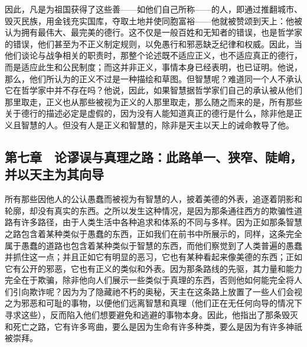 因此，凡是为祖国获得了这些善——如他们自己所称——的人，即通过推翻城市、毁灭民族，用金钱充实国库，夺取土地并使同胞富裕——他就被赞颂到天上：他被认为拥有最伟大、最完美的德行。这不仅是一般百姓和无知者的错误，也是哲学家的错误，他们甚至为不正义制定规则，以免愚行和邪恶缺乏纪律和权威。因此，当他们谈论与战争相关的职责时，那整个论述既不适应正义，也不适应真正的德行，而是适应此生和公民制度；而这并非正义，事情本身已经表明，也已证明。他说，那么，他们所认为的正义不过是一种描绘和草图。但智慧呢？难道同一个人不承认它在哲学家中并不存在吗？他说，因此，如果智慧据哲学家们自己的承认被从他们那里取走，正义也从那些被视为正义的人那里取走，那么随之而来的是，所有那些关于德行的描述必定是虚假的，因为没有人能知道真正的德行是什么，除非他是正义且智慧的人。但没有人是正义和智慧的，除非是天主以天上的诫命教导了他。\par


\subsection{第七章　论谬误与真理之路：此路单一、狭窄、陡峭，并以天主为其向导}

所有那些因他人的公认愚蠢而被视为有智慧的人，披着美德的外表，追逐着阴影和轮廓，却没有真实的东西。之所以发生这种情况，是因为那条通往西方的欺骗性道路有许多路径，由于人类生活中各种追求和体系的不同与多样。因为正如那条智慧之路包含着某种类似于愚蠢的东西，正如我们在前书中所展示的，同样，这条完全属于愚蠢的道路也包含着某种类似于智慧的东西，而他们察觉到了人类普遍的愚蠢并抓住这一点；并且正如它有明显的恶习，它也有某种看起来像美德的东西；正如它有公开的邪恶，它也有正义的类似和外表。因为那条路线的先驱，其力量和能力完全在于欺骗，除非他向人们展示一些类似于真理的东西，否则他如何能完全将人们引向欺诈呢？因为为了隐藏祂不朽的奥秘，天主在这条路上放置了一些人们会视之为邪恶和可耻的事物，以便他们远离智慧和真理（他们正在无任何向导的情况下寻求这些），反而陷入他们想要避免和逃避的事物本身。因此，他指出了那条毁灭和死亡之路，它有许多弯曲，要么是因为生命有许多种类，要么是因为有许多神祇被崇拜。\par

